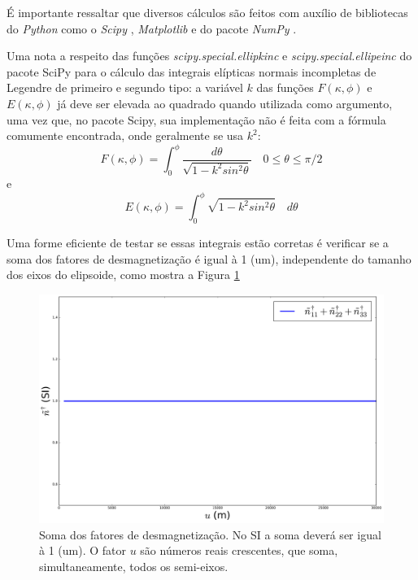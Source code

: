 É importante ressaltar que diversos cálculos são feitos com auxílio de bibliotecas do \textit{Python} como o \textit{Scipy} \citet{scipy}, \textit{Matplotlib} \citet{matplotlib} e do pacote \textit{NumPy} \citet{numpy}.

Uma nota a respeito das funções \textit{scipy.special.ellipkinc} e \textit{scipy.special.ellipeinc} do pacote SciPy para o cálculo das integrais elípticas normais incompletas de Legendre de primeiro e segundo tipo: a variável $k$ das funções $F(\kappa, \phi)$ e $E(\kappa, \phi)$ já deve ser elevada ao quadrado quando utilizada como argumento, uma vez que, no pacote Scipy, sua implementação não é feita com a fórmula comumente encontrada, onde geralmente se usa $k^2$:
\begin{equation}
F(\kappa, \phi) = \int_{0}^{\phi}{\dfrac{d\theta}{\sqrt{1-k^{2}sin^{2}\theta}}} \quad 0\le\theta\le\pi/2
\label{eq:integral_elip1}
\end{equation}
e
\begin{equation}
E(\kappa, \phi) = \int_{0}^{\phi}{\sqrt{1-k^{2}sin^{2}\theta}} \quad d\theta
\label{eq:integral_elip2}
\end{equation}

Uma forme eficiente de testar se essas integrais estão corretas é verificar se a soma dos fatores de desmagnetização é igual à 1 (um), independente do tamanho dos eixos do elipsoide, como mostra a Figura \ref{fig:teste_n_soma}
\begin{figure}[hbt!]
	\centering \includegraphics[width=15 cm,height=10 cm]{figures/test_n_soma}
	\caption[Soma dos fatores de desmagnetização. No SI a soma deverá ser igual à 1 (um).]{Soma dos fatores de desmagnetização. No SI a soma deverá ser igual à 1 (um). O fator $u$ são números reais crescentes, que soma, simultaneamente, todos os semi-eixos.}
	\label{fig:teste_n_soma}
\end{figure}

